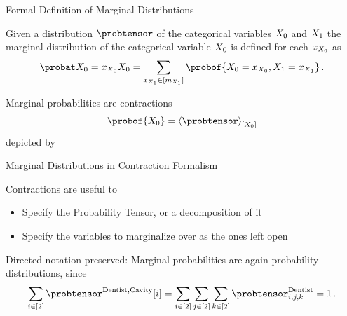 \documentclass{beamer}
\begin{document}
\begin{frame}{Formal Definition of Marginal Distributions}

\begin{definition}\label{def:marginalProbability}
	Given a distribution $\probtensor$ of the categorical variables $X_{0}$ and $X_{1}$ the marginal distribution of the categorical variable $X_{0}$ is defined for each $x_{X_{0}}$ as
		\[ 
		\margprobof{\exrandom=\catindexof{\exrandom}}{\exrandom}
		 = \sum_{\catindexof{\secexrandom}\in[\catdimof{\secexrandom}]} \probof{\exrandom=\catindexof{\exrandom},\secexrandom=\catindexof{\secexrandom}} \, . \]
\end{definition}

Marginal probabilities are contractions
\begin{align*}
	\probof{\exrandom} = \contractionof{\probtensor}{\exrandom}
\end{align*}
depicted by
\begin{center}
	
\end{center}

\end{frame}






\begin{frame}{Marginal Distributions in Contraction Formalism}

Contractions are useful to
\begin{itemize}
	\item Specify the Probability Tensor, or a decomposition of it
	\item Specify the variables to marginalize over as the ones left open
\end{itemize}

\begin{center}
	
\end{center}

\medskip 

Directed notation preserved: Marginal probabilities are again probability distributions, since
\begin{align}
	\sum_{i\in[2]}\probtensor^{\mathrm{Dentist},\mathrm{Cavity}}[i] = \sum_{i\in[2]} \sum_{j\in[2]} \sum_{k\in[2]} \probtensor^{\mathrm{Dentist}}_{i,j,k} = 1 \, . 
\end{align}


\end{frame}
\end{document}
